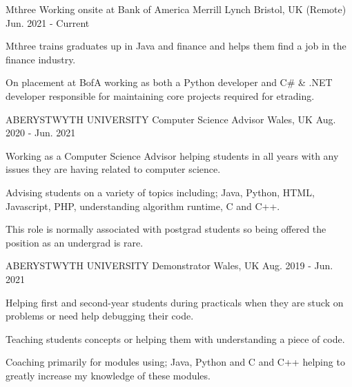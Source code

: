 

\begin{cventries}

\cventry
    {Mthree} %
    {Working onsite at Bank of America Merrill Lynch} %
    {Bristol, UK (Remote)} %
    {Jun. 2021 - Current} %
    {
      \begin{cvitems} %
        \item {Mthree trains graduates up in Java and finance and helps them find a job in the finance industry.}
        \item {On placement at BofA working as both a Python developer and C\# \& .NET developer responsible for maintaining core projects required for etrading.}
      \end{cvitems}
    }

  \cventry
    {ABERYSTWYTH UNIVERSITY} %
    {Computer Science Advisor} %
    {Wales, UK} %
    {Aug. 2020 - Jun. 2021} %
    {
      \begin{cvitems} %
        \item {Working as a Computer Science Advisor helping students in all years with any issues they are having related to computer science.}
        \item {Advising students on a variety of topics including; Java, Python, HTML, Javascript, PHP, understanding algorithm runtime, C and C++.}
        \item {This role is normally associated with postgrad students so being offered the position as an undergrad is rare.}
      \end{cvitems}
    }

  \cventry
    {ABERYSTWYTH UNIVERSITY} %
    {Demonstrator} %
    {Wales, UK} %
    {Aug. 2019 - Jun. 2021} %
    {
      \begin{cvitems} %
        \item {Helping first and second-year students during practicals when they are stuck on problems or need help debugging their code.}
        \item {Teaching students concepts or helping them with understanding a piece of code.}
        \item {Coaching primarily for modules using; Java, Python and C and C++ helping to greatly increase my knowledge of these modules.}
      \end{cvitems}
    }


\end{cventries}
